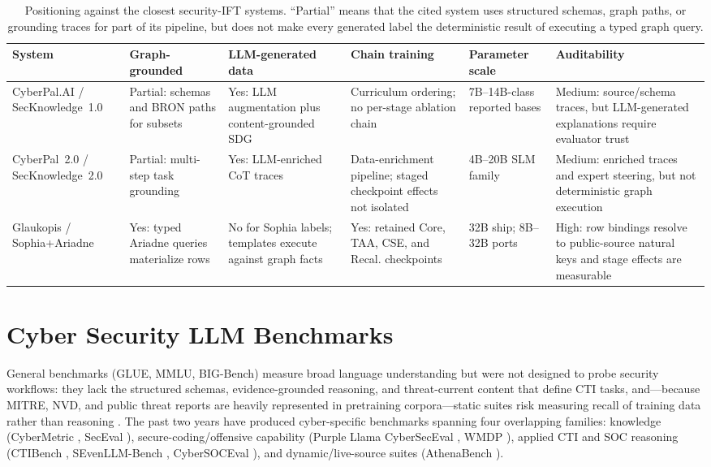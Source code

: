 \documentclass[conference]{IEEEtran}
\begin{document}
\begin{table}[t]
\centering
\caption{Positioning against the closest security-IFT systems. ``Partial'' means that the cited system uses structured schemas, graph paths, or grounding traces for part of its pipeline, but does not make every generated label the deterministic result of executing a typed graph query.}
\label{tab:positioning}
\scriptsize
\setlength{\tabcolsep}{3pt}
\begin{tabular}{p{2.3cm}p{2.1cm}p{2.2cm}p{2.5cm}p{2.1cm}p{3.3cm}}
\hline
\textbf{System} & \textbf{Graph-grounded} & \textbf{LLM-generated data} & \textbf{Chain training} & \textbf{Parameter scale} & \textbf{Auditability} \\
\hline
CyberPal.AI / SecKnowledge~1.0 \cite{levi2024cyberpal} & Partial: schemas and BRON paths for subsets & Yes: LLM augmentation plus content-grounded SDG & Curriculum ordering; no per-stage ablation chain & 7B--14B-class reported bases & Medium: source/schema traces, but LLM-generated explanations require evaluator trust \\
CyberPal~2.0 / SecKnowledge~2.0 \cite{levi2025toward} & Partial: multi-step task grounding & Yes: LLM-enriched CoT traces & Data-enrichment pipeline; staged checkpoint effects not isolated & 4B--20B SLM family & Medium: enriched traces and expert steering, but not deterministic graph execution \\
Glaukopis / Sophia+Ariadne & Yes: typed Ariadne queries materialize rows & No for Sophia labels; templates execute against graph facts & Yes: retained Core, TAA, CSE, and Recal. checkpoints & 32B ship; 8B--32B ports & High: row bindings resolve to public-source natural keys and stage effects are measurable \\
\hline
\end{tabular}
\end{table}

\section{Cyber Security LLM Benchmarks}
\label{sec:benchmarks}

General benchmarks (GLUE, MMLU, BIG-Bench) measure broad language understanding but were not designed to probe security workflows: they lack the structured schemas, evidence-grounded reasoning, and threat-current content that define CTI tasks, and---because MITRE, NVD, and public threat reports are heavily represented in pretraining corpora---static suites risk measuring recall of training data rather than reasoning \cite{alam2025athenabench}. The past two years have produced cyber-specific benchmarks spanning four overlapping families: knowledge (CyberMetric \cite{tihanyi2024cybermetric}, SecEval \cite{hu2024seceval}), secure-coding/offensive capability (Purple Llama CyberSecEval \cite{bhatt2023purplellama,bhatt2024cyberseceval2}, WMDP \cite{li2024wmdp}), applied CTI and SOC reasoning (CTIBench \cite{alam2024ctibench}, SEvenLLM-Bench \cite{ji2024sevenllm}, CyberSOCEval \cite{cybersoceval2025}), and dynamic/live-source suites (AthenaBench \cite{alam2025athenabench}).
\end{document}

